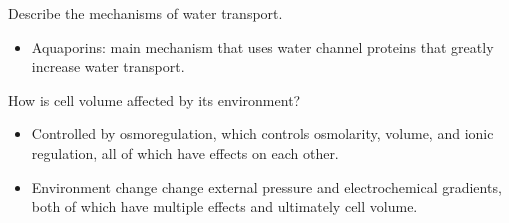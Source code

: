 \documentclass[12pt,a4paper]{article}
\begin{document}
\begin{itemize}
    {\color{G-Moon}\item Describe the mechanisms of water transport.}
        \begin{itemize}
            \item Aquaporins: main mechanism that uses water channel proteins that greatly increase water transport.
        \end{itemize}
    {\color{G-Moon}\item How is cell volume affected by its environment?}
        \begin{itemize}
            \item Controlled by osmoregulation, which controls osmolarity, volume, and ionic regulation, all of which have effects on each other.
            \item Environment change change external pressure and electrochemical gradients, both of which have multiple effects and ultimately cell volume.
        \end{itemize}
\end{itemize}
\end{document}
